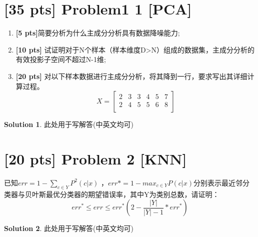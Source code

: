\documentclass[a4paper,UTF8]{article}
\theoremstyle{definition}
\newtheorem*{solution}{Solution}
\begin{document}
\newpage

\section*{\textbf{[35 pts]} Problem1 1 [PCA]}

\begin{enumerate}[(1)]\item \textbf{[5 pts]}简要分析为什么主成分分析具有数据降噪能力;
	\item \textbf{[10 pts]} 试证明对于N个样本（样本维度D>N）组成的数据集，主成分分析的有效投影子空间不超过N-1维;
	\item \textbf{[20 pts]} 对以下样本数据进行主成分分析，将其降到一行，要求写出其详细计算过程。
\begin{equation}
	X=
 \left[
 \begin{array}{cccccc}
     2 & 3 & 3 &4 &5 &7 \\
    2 &4 &5 &5 &6 &8 \\
 \end{array}
 \right]        
 \end{equation}
	
	
\end{enumerate}

\begin{solution}
此处用于写解答(中英文均可)
\end{solution}

\section*{[20 pts] Problem 2 [KNN]}
已知$err=1-\sum_{c \in Y}P^2(c|x)$
，$err*=1-max_{c \in Y}P(c|x)$分别表示最近邻分类器与贝叶斯最优分类器的期望错误率，其中Y为类别总数，请证明：\begin{equation*}err^* \leq err \leq err^*(2-\frac{|Y|}{|Y|-1}*err^*)\end{equation*}

\begin{solution}
此处用于写解答(中英文均可)
\end{solution}
\newpage
\end{document}
